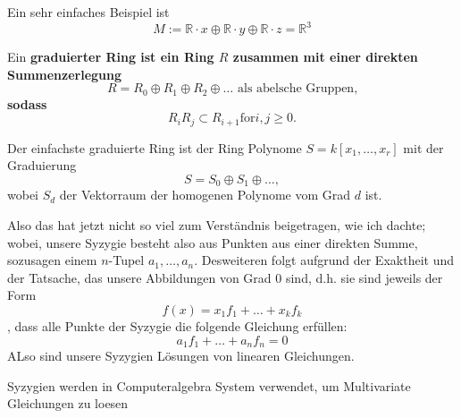 \documentclass{article}
\begin{document}
	\begin{bsp}
		Ein sehr einfaches Beispiel ist 
		\[
			M:= \mathbb{R} \cdot x \oplus
			\mathbb{R} \cdot y \oplus
			\mathbb{R} \cdot z =
			\mathbb{R}^3
		\]
	\end{bsp}
	\begin{defn}
		Ein \bf{graduierter Ring} ist ein Ring 
		\( R \)
		zusammen mit einer direkten Summenzerlegung
		\[
			R=R_{0} \oplus R_{1} \oplus R_{2} \oplus \dots 
			\text{ als abelsche Gruppen,}
		\]
		sodass 
		\[
			R_{i}R_{j} \subset R_{i+1} \text{for} i,j \ge 0.
		\]
	\end{defn}
	\begin{bsp}
		Der einfachste graduierte Ring ist der Ring Polynome
		\( S = k\left[ x_{1}, \dots ,x_{r} \right] \)
		mit der Graduierung 
		\[
			S=S_{0} \oplus S_{1} \oplus \dots ,
		\]
		wobei 
		\( S_{d} \) 
		der Vektorraum der homogenen Polynome vom Grad
		\( d \) 
		ist.
	\end{bsp}
	
	Also das hat jetzt nicht so viel zum Verst\"andnis beigetragen, 
	wie ich dachte;  
	wobei,
	unsere Syzygie besteht also aus Punkten 
	aus einer direkten Summe, 
	sozusagen einem 
	\(n\)-Tupel 
	\(a_{1},\dots,a_{n}\).
	Desweiteren folgt aufgrund der Exaktheit und der Tatsache, 
	das unsere Abbildungen von Grad 0 sind,
	d.h. sie sind jeweils der Form
	\[
		f\left( x \right)=x_{1}f_{1} + \dots + x_{k}f_{k}
	\],
	dass alle Punkte der Syzygie die folgende Gleichung erf\"ullen:
	\[
		a_{1} f_{1} + \dots + a_{n} f_{n} = 0	
	\]
	ALso sind unsere Syzygien L\"osungen von linearen Gleichungen.
	
	Syzygien werden in Computeralgebra System verwendet,
	um Multivariate Gleichungen zu loesen\nocite{WA_1}

		
\end{document}
